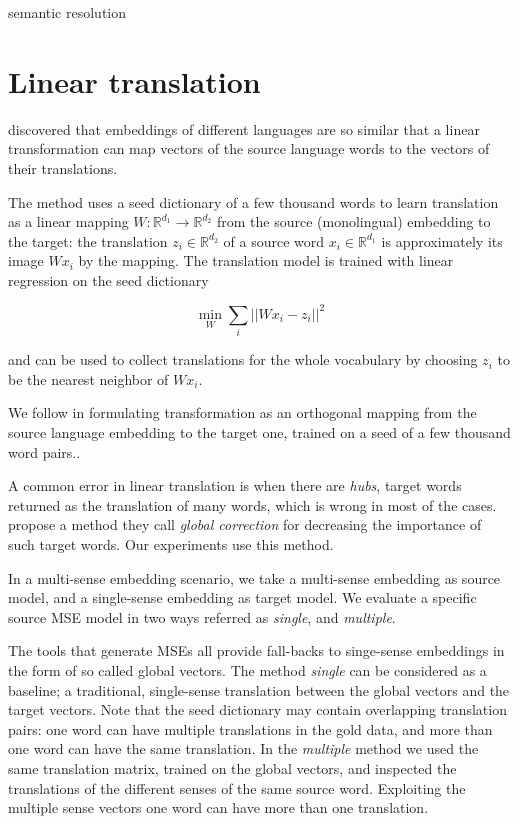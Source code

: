 \documentclass[11pt]{article}
\newcommand{\Ro}{\mathbb{R}^{d_1}}
\newcommand{\Rt}{\mathbb{R}^{d_2}}
\begin{document}
semantic resolution

\section{Linear translation}

 \cite{Mikolov:2013x} discovered that embeddings of different languages are so
 similar that a linear transformation can map vectors of the source language
 words to the vectors of their translations.

The method uses a seed dictionary of a few thousand words to learn translation
as a linear mapping $W: \mathbb{R}^{d_1}\rightarrow \mathbb{R}^{d_2}$ from the
source (monolingual) embedding to the target: the translation $z_i \in \Rt$ of
a source word $x_i \in \Ro$ is approximately its image $Wx_i$ by the mapping.
The translation model is trained with linear regression on the seed dictionary

\[\min_W \sum_i || Wx_i - z_i ||^2 \]

\noindent and can be used to collect translations for the whole vocabulary by
choosing $z_i$ to be the nearest neighbor of $Wx_i$.


We follow \cite{Xing:2015} in formulating transformation as an orthogonal
mapping from the source language embedding to the target one, trained on a seed
of a few thousand word pairs..

A common error in linear translation is when there are \emph{hubs}, target
words returned as the translation of many words, which is wrong in most of the
cases.  \cite{Dinu:2015} propose a method they call \emph{global correction}
for decreasing the importance of such target words. Our experiments use this
method.

In a multi-sense embedding scenario, we take a multi-sense embedding
as source model, and a single-sense embedding as target model.
We evaluate a specific source MSE model in two ways
referred as \emph{single}, and \emph{multiple}.

The tools that generate MSEs all provide fall-backs to singe-sense embeddings
in the form of so called global vectors. The method \emph{single} can be
considered as a baseline; a traditional, single-sense translation between the
global vectors and the target vectors.  Note that the seed dictionary may
contain overlapping translation pairs: one word can have multiple translations
in the gold data, and more than one word can have the same translation.  In
the \emph{multiple} method we used the same translation matrix, trained on the
global vectors, and inspected the translations of the different senses of the
same source word.  Exploiting the multiple sense vectors one word can have
more than one translation.
\end{document}
